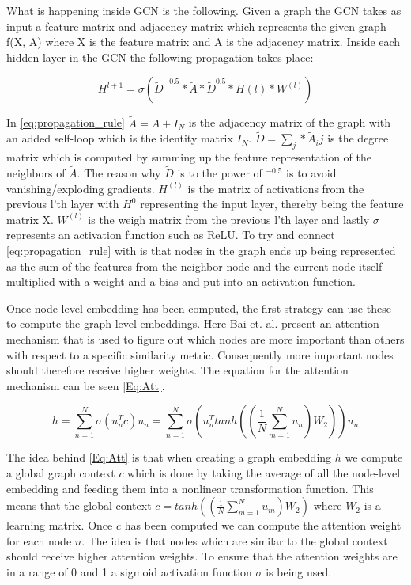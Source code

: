 What is happening inside GCN is the following. Given a graph the GCN takes as input a feature matrix and adjacency matrix which represents the given graph f(X, A) where X is the feature matrix and A is the adjacency matrix. Inside each hidden layer in the GCN the following propagation takes place\cite{Kipf2016}:


\begin{equation}
\label{eq:propagation_rule}
H^{l+1} = \sigma (\tilde{D}^{-0.5}*\tilde{A}*\tilde{D}^{0.5}*H{(l)} * W^{(l)})
\end{equation}

In \autoref{eq:propagation_rule} $\tilde{A} = A +I_N$ is the adjacency matrix of the graph with an added self-loop which is the identity matrix $I_N$. $\tilde{D} = \sum_j * \tilde{A}_ij$ is the degree matrix which is computed by summing up the feature representation of the neighbors of $\tilde{A}$. The reason why $\tilde{D}$ is to the power of $^{-0.5}$ is to avoid vanishing/exploding gradients. $H^{(l)}$ is the matrix of activations from the previous l'th layer with $H^0$ representing the input layer, thereby being the feature matrix X. $W^{(l)}$ is the weigh matrix from the previous l'th layer and lastly $\sigma$ represents an activation function such as ReLU\cite{Kipf2016}. To try and connect \autoref{eq:propagation_rule} with  is that nodes in the graph ends up being represented as the sum of the features from the neighbor node and the current node itself multiplied with a weight and a bias and put into an activation function.


Once node-level embedding has been computed, the first strategy can use these to compute the graph-level embeddings. Here Bai et. al. present an attention mechanism that is used to figure out which nodes are more important than others with respect to a specific similarity metric. Consequently more important nodes should therefore receive higher weights\cite{Bai2018}. The equation for the attention mechanism can be seen \autoref{Eq:Att}.



\begin{equation}\label{Eq:Att}
h= \sum^N_{n=1} \sigma(u^T_nc)u_n=\sum^N_{n=1}\sigma(u^T_ntanh((\frac{1}{N}\sum_{m=1}^Nu_n)W_2))u_n
\end{equation}

The idea behind \autoref{Eq:Att} is that when creating a graph embedding $h$ we compute a global graph context $c$ which is done by taking the average of all the node-level embedding and feeding them into a nonlinear transformation function. This means that the global context $c=tanh((\frac{1}{N}\sum_{m=1}^Nu_m)W_2)$ where $W_2$ is a learning matrix. Once $c$ has been computed we can compute the attention weight for each node $n$. The idea is that nodes which are similar to the global context should receive higher attention weights. To ensure that the attention weights are in a range of 0 and 1 a sigmoid activation function $\sigma$ is being used\cite{Bai2018}.


